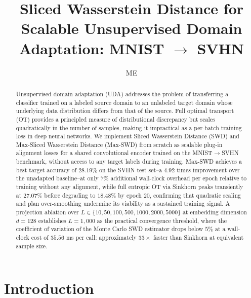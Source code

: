 \documentclass{article}
\title{Sliced Wasserstein Distance for Scalable Unsupervised Domain Adaptation: MNIST $\to$ SVHN}
\author{ME}
\begin{document}
	
	\maketitle
	
	\begin{abstract}
		\noindent Unsupervised domain adaptation (UDA) addresses the problem of transferring a classifier trained on a labeled source domain to an unlabeled target domain whose underlying data distribution differs from that of the source. Full optimal transport (OT) provides a principled measure of distributional discrepancy but scales quadratically in the number of samples, making it impractical as a per-batch training loss in deep neural networks. We implement Sliced Wasserstein Distance (SWD) and Max-Sliced Wasserstein Distance (Max-SWD) from scratch as scalable plug-in alignment losses for a shared convolutional encoder trained on the MNIST$\to$SVHN benchmark, without access to any target labels during training. Max-SWD achieves a best target accuracy of $28.19\%$ on the SVHN test set--a $4.92$ times improvement over the unadapted baseline--at only $7\%$ additional wall-clock overhead per epoch relative to training without any alignment, while full entropic OT via Sinkhorn peaks transiently at $27.07\%$ before degrading to $18.48\%$ by epoch $20$, confirming that quadratic scaling and plan over-smoothing undermine its viability as a sustained training signal. A projection ablation over $L \in \{10, 50, 100, 500, 1000, 2000, 5000\}$ at embedding dimension $d = 128$ establishes $L = 1{,}000$ as the practical convergence threshold, where the coefficient of variation of the Monte Carlo SWD estimator drops below $5\%$ at a wall-clock cost of $35.56$ ms per call: approximately $33\times$ faster than Sinkhorn at equivalent sample size.
	\end{abstract}
	
	
	
	
	
	\section{Introduction}
	
\end{document}
